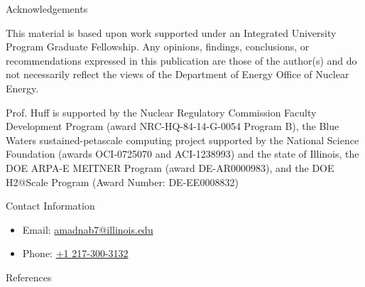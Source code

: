 \documentclass[final]{beamer}
\newlength{\onecolwid}
\newlength{\threecolwid}
\begin{document}
\begin{frame}[t]
\begin{columns}[t,totalwidth=\threecolwid]
\begin{column}{\onecolwid}


\begin{block}{Acknowledgements}
	
	This material is based upon work supported under an Integrated University 
Program Graduate Fellowship. Any opinions, findings, conclusions, or 
recommendations expressed in this publication are those of the author(s) 
and do not necessarily reflect the views of the Department of Energy Office 
of Nuclear Energy.

Prof. Huff is supported by the Nuclear Regulatory Commission Faculty
Development Program (award NRC-HQ-84-14-G-0054 Program B), the Blue Waters
sustained-petascale computing project supported by the National Science
Foundation (awards OCI-0725070 and ACI-1238993) and the state of Illinois, the
DOE ARPA-E MEITNER Program (award DE-AR0000983), and the DOE H2@Scale Program
(Award Number: DE-EE0008832)
	
\end{block}



\begin{alertblock}{Contact Information}
	\begin{itemize}
		\item Email: \href{mailto:amandab7@illinois.edu}{amadnab7@illinois.edu}
		\item Phone: \href{tel:12173003132}{+1 217-300-3132}
	\end{itemize}
	
\end{alertblock}

\begin{block}{References}


\end{block}
\end{column}
\end{columns}
\end{frame}
\end{document}
